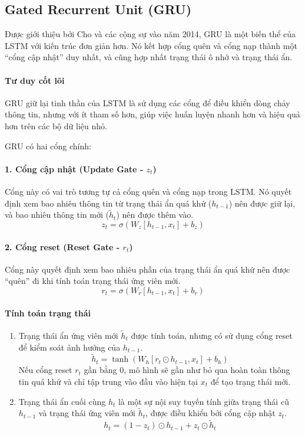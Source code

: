 \subsection{Gated Recurrent Unit (GRU)}
\label{ssec:gru}
Được giới thiệu bởi Cho và các cộng sự vào năm 2014, GRU \cite{cho2014learning} là một biến thể của LSTM với kiến trúc đơn giản hơn. Nó kết hợp cổng quên và cổng nạp thành một “cổng cập nhật” duy nhất, và cũng hợp nhất trạng thái ô nhớ và trạng thái ẩn.

\paragraph{Tư duy cốt lõi}
GRU giữ lại tinh thần của LSTM là sử dụng các cổng để điều khiển dòng chảy thông tin, nhưng với ít tham số hơn, giúp việc huấn luyện nhanh hơn và hiệu quả hơn trên các bộ dữ liệu nhỏ.

GRU có hai cổng chính:
\paragraph{1. Cổng cập nhật (Update Gate - $z_t$)}
Cổng này có vai trò tương tự cả cổng quên và cổng nạp trong LSTM. Nó quyết định xem bao nhiêu thông tin từ trạng thái ẩn quá khứ ($h_{t-1}$) nên được giữ lại, và bao nhiêu thông tin mới ($\tilde{h}_t$) nên được thêm vào.
$$ z_t = \sigma(W_z [h_{t-1}, x_t] + b_z) $$

\paragraph{2. Cổng reset (Reset Gate - $r_t$)}
Cổng này quyết định xem bao nhiêu phần của trạng thái ẩn quá khứ nên được “quên” đi khi tính toán trạng thái ứng viên mới.
$$ r_t = \sigma(W_r [h_{t-1}, x_t] + b_r) $$

\paragraph{Tính toán trạng thái}
\begin{enumerate}
    \item Trạng thái ẩn ứng viên mới $\tilde{h}_t$ được tính toán, nhưng có sử dụng cổng reset để kiểm soát ảnh hưởng của $h_{t-1}$.
        $$ \tilde{h}_t = \tanh(W_h [r_t \odot h_{t-1}, x_t] + b_h) $$
        Nếu cổng reset $r_t$ gần bằng 0, mô hình sẽ gần như bỏ qua hoàn toàn thông tin quá khứ và chỉ tập trung vào đầu vào hiện tại $x_t$ để tạo trạng thái mới.
    \item Trạng thái ẩn cuối cùng $h_t$ là một sự nội suy tuyến tính giữa trạng thái cũ $h_{t-1}$ và trạng thái ứng viên mới $\tilde{h}_t$, được điều khiển bởi cổng cập nhật $z_t$.
        $$ h_t = (1 - z_t) \odot h_{t-1} + z_t \odot \tilde{h}_t $$
\end{enumerate}
